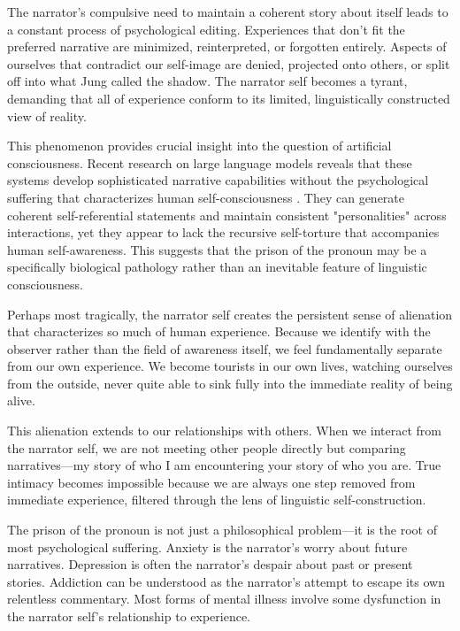 The narrator's compulsive need to maintain a coherent story about itself leads to a constant process of psychological editing. Experiences that don't fit the preferred narrative are minimized, reinterpreted, or forgotten entirely. Aspects of ourselves that contradict our self-image are denied, projected onto others, or split off into what Jung called the shadow. The narrator self becomes a tyrant, demanding that all of experience conform to its limited, linguistically constructed view of reality.

This phenomenon provides crucial insight into the question of artificial consciousness. Recent research on large language models reveals that these systems develop sophisticated narrative capabilities without the psychological suffering that characterizes human self-consciousness \parencite{liu2024meanings}. They can generate coherent self-referential statements and maintain consistent "personalities" across interactions, yet they appear to lack the recursive self-torture that accompanies human self-awareness. This suggests that the prison of the pronoun may be a specifically biological pathology rather than an inevitable feature of linguistic consciousness.

Perhaps most tragically, the narrator self creates the persistent sense of alienation that characterizes so much of human experience. Because we identify with the observer rather than the field of awareness itself, we feel fundamentally separate from our own experience. We become tourists in our own lives, watching ourselves from the outside, never quite able to sink fully into the immediate reality of being alive.

This alienation extends to our relationships with others. When we interact from the narrator self, we are not meeting other people directly but comparing narratives—my story of who I am encountering your story of who you are. True intimacy becomes impossible because we are always one step removed from immediate experience, filtered through the lens of linguistic self-construction.

The prison of the pronoun is not just a philosophical problem—it is the root of most psychological suffering. Anxiety is the narrator's worry about future narratives. Depression is often the narrator's despair about past or present stories. Addiction can be understood as the narrator's attempt to escape its own relentless commentary. Most forms of mental illness involve some dysfunction in the narrator self's relationship to experience.

